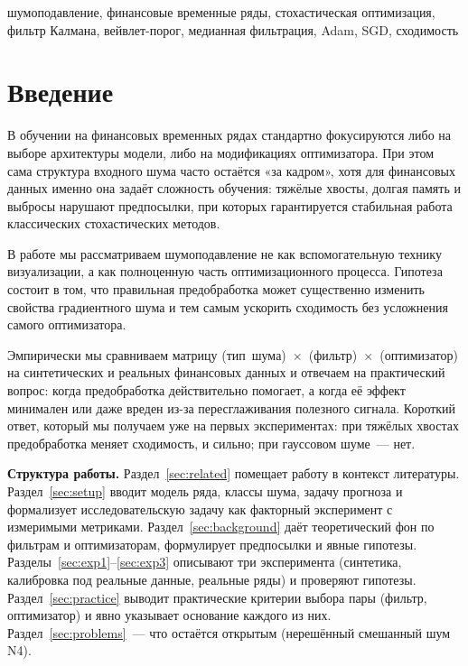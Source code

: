 \documentclass[conference]{IEEEtran}
\begin{document}
\begin{IEEEkeywords}
шумоподавление, финансовые временные ряды, стохастическая оптимизация,
фильтр Калмана, вейвлет-порог, медианная фильтрация, Adam, SGD, сходимость
\end{IEEEkeywords}


\section{Введение}

В обучении на финансовых временных рядах стандартно фокусируются либо на
выборе архитектуры модели, либо на модификациях оптимизатора. При этом сама
структура входного шума часто остаётся «за кадром», хотя для финансовых
данных именно она задаёт сложность обучения: тяжёлые хвосты, долгая память
и выбросы нарушают предпосылки, при которых гарантируется стабильная работа
классических стохастических методов.

В работе мы рассматриваем шумоподавление не как вспомогательную технику
визуализации, а как полноценную часть оптимизационного процесса. Гипотеза
состоит в том, что правильная предобработка может существенно изменить
свойства градиентного шума и тем самым ускорить сходимость без усложнения
самого оптимизатора.

Эмпирически мы сравниваем матрицу
(тип~шума)~$\times$~(фильтр)~$\times$~(оптимизатор) на синтетических и
реальных финансовых данных и отвечаем на практический вопрос: когда
предобработка действительно помогает, а когда её эффект минимален или даже
вреден из-за пересглаживания полезного сигнала. Короткий ответ, который мы
получаем уже на первых экспериментах: при тяжёлых хвостах предобработка
меняет сходимость, и сильно; при гауссовом шуме~--- нет.

\textbf{Структура работы.} Раздел~\ref{sec:related} помещает работу в
контекст литературы. Раздел~\ref{sec:setup} вводит модель ряда, классы
шума, задачу прогноза и формализует исследовательскую задачу как факторный
эксперимент с измеримыми метриками. Раздел~\ref{sec:background} даёт
теоретический фон по фильтрам и оптимизаторам, формулирует предпосылки и
явные гипотезы. Разделы~\ref{sec:exp1}--\ref{sec:exp3} описывают три
эксперимента (синтетика, калибровка под реальные данные, реальные ряды) и
проверяют гипотезы. Раздел~\ref{sec:practice} выводит практические критерии
выбора пары (фильтр, оптимизатор) и явно указывает основание каждого из них.
Раздел~\ref{sec:problems}~--- что остаётся открытым (нерешённый смешанный
шум N4).
\end{document}
